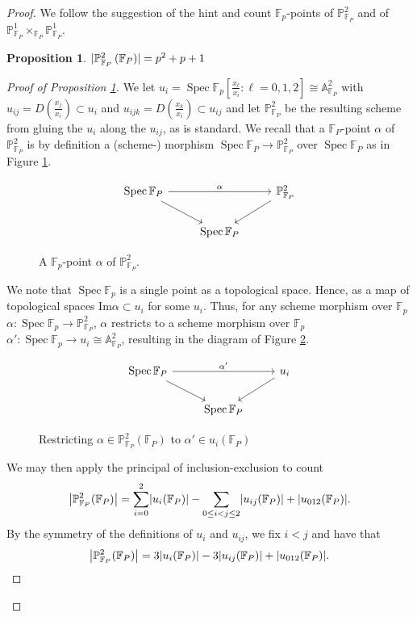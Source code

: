 \documentclass[english,letter,doublesided]{article}
\DeclareMathOperator{\spec}{Spec}
\DeclarePairedDelimiter\abs{\lvert}{\rvert}%
\renewcommand{\AA}{\mathbb{A}}
\newcommand{\FF}{\mathbb{F}}
\newcommand{\PP}{\mathbb{P}}
\newenvironment{subproof}[1][\proofname]{%
	\renewcommand{\qedsymbol}{$\blacksquare$}%
	\begin{proof}[#1]%
	}{%
	\end{proof}%
}
\newtheorem{prop}[thm]{Proposition}
\theoremstyle{remark}
\theoremstyle{definition}
\newcommand{\im}{\mathrm{Im}}
\newcommand{\Fp}{{\FF_P}}
\begin{document}
\begin{proof}
	We follow the suggestion of the hint and count $\FF_p$-points of $\PP_{\Fp}^2$ and of $\PP_\Fp^1\times_\Fp\PP_\Fp^1$.
	
	\begin{prop}\label{p2fp}
	$	\abs{\PP_{\Fp}^2\left(\Fp\right)}=p^2+p+1$
	\end{prop}
\begin{subproof}[Proof of Proposition \ref{p2fp}] We let $u_i=\spec \FF_p[\frac{x_\ell}{x_i}:\ell=0,1,2]\cong \AA^2_\Fp$ with $u_{ij}=D(\frac{x_j}{x_i})\subset u_i$ and $u_{ijk}=D(\frac{x_k}{x_i})\subset u_{ij}$ and let $\PP^2_\Fp$ be the resulting scheme from gluing the $u_i$ along the $u_{ij}$, as is standard. 
	We recall that a $\Fp$-point $\alpha$ of $\PP^2_\Fp$ is by definition a (scheme-) morphism $\spec \Fp\to \PP^2_\Fp$ over $\spec \Fp$ as in Figure \ref{4fppt}.
	\begin{figure}[h!]
		$$\begin{tikzcd}
			\spec \Fp \arrow[dr]\arrow[rr,"\alpha"]&&\PP^2_\Fp\arrow[dl]\\&\spec \Fp &
		\end{tikzcd}$$\caption{A $\FF_p$-point $\alpha$ of $\PP^2_\Fp$.\label{4fppt}}
	\end{figure}

We note that $\spec \FF_p$ is a single point as a topological space. Hence, as a map of topological spaces $\im \alpha\subset u_i$ for some $u_i$. Thus, for any scheme morphism over $ \FF_p$ $\alpha:\spec \FF_p\to \PP^2_\Fp$, $\alpha$ restricts to a scheme morphism over $ \FF_p$ $\alpha':\spec \FF_p\to u_i\cong \AA^2_\Fp$, resulting in the diagram of Figure \ref{4resui}.
\begin{figure}[h!]
	$$\begin{tikzcd}
	\spec \Fp \arrow[dr]\arrow[rr,"\alpha'"]&&u_i\arrow[dl]\\&\spec \Fp &
	\end{tikzcd}$$\caption{Restricting $\alpha\in \PP^2_\Fp(\Fp)$ to $\alpha'\in u_i(\Fp)$ \label{4resui}}
\end{figure} We may then apply the principal of inclusion-exclusion to count $$\abs*{\PP^2_\Fp(\Fp)}=\sum_{i=0}^2 \abs*{u_i(\Fp)}-\sum_{0\leq i<j\leq 2} \abs*{u_{ij}(\Fp)}+\abs*{u_{012}(\Fp)}.$$ By the symmetry of the definitions of $u_i$ and $u_{ij}$, we fix $i<j$ and have that  \begin{equation}\abs*{\PP^2_\Fp(\Fp)}=3\abs*{ u_i(\Fp)}-3\abs*{u_{ij}(\Fp)}+\abs*{u_{012}(\Fp)}.\label{4incex}\end{equation}


\end{subproof}
\end{proof}
\end{document}
